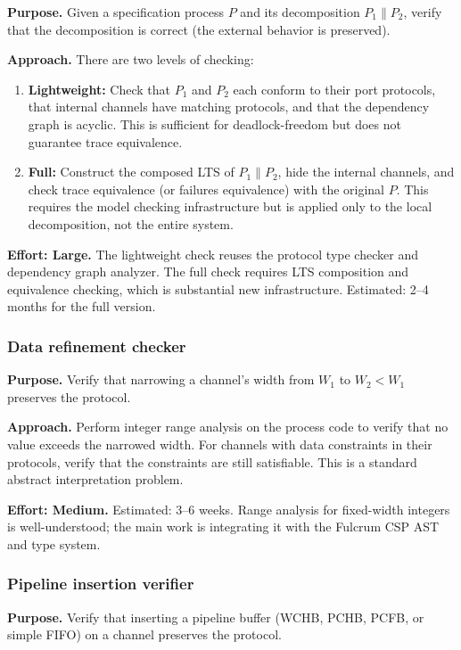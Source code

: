 \documentclass[11pt]{article}
\begin{document}
\textbf{Purpose.} Given a specification process $P$ and its
decomposition $P_1 \| P_2$, verify that the decomposition is correct
(the external behavior is preserved).

\textbf{Approach.} There are two levels of checking:
\begin{enumerate}
\item \textbf{Lightweight:} Check that $P_1$ and $P_2$ each conform
  to their port protocols, that internal channels have matching
  protocols, and that the dependency graph is acyclic.  This is
  sufficient for deadlock-freedom but does not guarantee trace
  equivalence.

\item \textbf{Full:} Construct the composed LTS of $P_1 \| P_2$,
  hide the internal channels, and check trace equivalence (or
  failures equivalence) with the original $P$.  This requires the
  model checking infrastructure but is applied only to the local
  decomposition, not the entire system.
\end{enumerate}

\textbf{Effort: Large.}  The lightweight check reuses the protocol
type checker and dependency graph analyzer.  The full check requires
LTS composition and equivalence checking, which is substantial new
infrastructure.  Estimated: 2--4 months for the full version.

\subsubsection{Data refinement checker}

\textbf{Purpose.} Verify that narrowing a channel's width from $W_1$
to $W_2 < W_1$ preserves the protocol.

\textbf{Approach.} Perform integer range analysis on the process code
to verify that no value exceeds the narrowed width.  For channels
with data constraints in their protocols, verify that the constraints
are still satisfiable.  This is a standard abstract interpretation
problem.

\textbf{Effort: Medium.}  Estimated: 3--6 weeks.  Range analysis for
fixed-width integers is well-understood; the main work is integrating
it with the Fulcrum CSP AST and type system.

\subsubsection{Pipeline insertion verifier}

\textbf{Purpose.} Verify that inserting a pipeline buffer (WCHB,
PCHB, PCFB, or simple FIFO) on a channel preserves the protocol.
\end{document}
